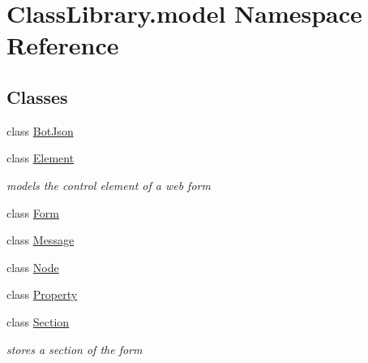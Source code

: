 \hypertarget{namespace_class_library_1_1model}{}\section{Class\+Library.\+model Namespace Reference}
\label{namespace_class_library_1_1model}
\subsection*{Classes}
\begin{DoxyCompactItemize}
\item 
class \mbox{\hyperlink{class_class_library_1_1model_1_1_bot_json}{Bot\+Json}}
\item 
class \mbox{\hyperlink{class_class_library_1_1model_1_1_element}{Element}}
\begin{DoxyCompactList}\small\item\em models the control element of a web form \end{DoxyCompactList}\item 
class \mbox{\hyperlink{class_class_library_1_1model_1_1_form}{Form}}
\item 
class \mbox{\hyperlink{class_class_library_1_1model_1_1_message}{Message}}
\item 
class \mbox{\hyperlink{class_class_library_1_1model_1_1_node}{Node}}
\item 
class \mbox{\hyperlink{class_class_library_1_1model_1_1_property}{Property}}
\item 
class \mbox{\hyperlink{class_class_library_1_1model_1_1_section}{Section}}
\begin{DoxyCompactList}\small\item\em stores a section of the form \end{DoxyCompactList}\end{DoxyCompactItemize}
